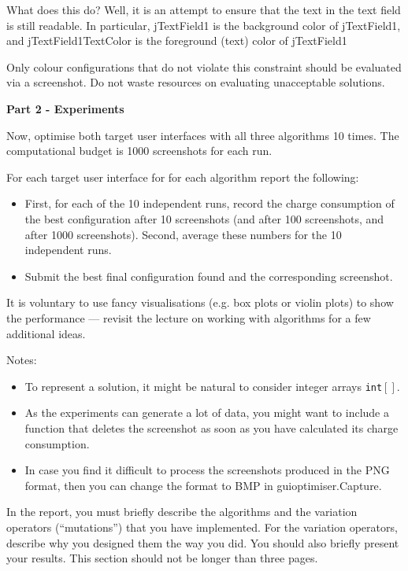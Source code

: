 \documentclass{pracs}
\begin{document}
What does this do? Well, it is an attempt to ensure that the text in the text field is still readable. In particular, jTextField1 is the background color of jTextField1, and jTextField1TextColor is the foreground (text) color of jTextField1

Only colour configurations that do not violate this constraint should be evaluated via a screenshot. Do not waste resources on evaluating unacceptable solutions.

\noindent\textbf{Part 2 - Experiments}

Now, optimise both target user interfaces with all three algorithms 10 times. The computational budget is 1000 screenshots for each run. 

For each target user interface for for each algorithm report the following:
\begin{itemize}
\item First, for each of the 10 independent runs, record the charge consumption of the best configuration after 10 screenshots (and after 100 screenshots, and after 1000 screenshots). Second, average these numbers for the 10 independent runs.
\item Submit the best final configuration found and the corresponding screenshot.
\end{itemize}

It is voluntary to use fancy visualisations (e.g. box plots or violin plots) to show the performance --- revisit the lecture on working with algorithms for a few additional ideas.

Notes:
\begin{itemize}
\item To represent a solution, it might be natural to consider integer arrays \texttt{int}$[]$.
\item As the experiments can generate a lot of data, you might want to include a function that deletes the screenshot as soon as you have calculated its charge consumption.
\item In case you find it difficult to process the screenshots produced in the PNG format, then you can change the format to BMP in guioptimiser.Capture.
\end{itemize}

In the report, you must briefly describe the algorithms and the variation operators (``mutations'') that you have implemented. For the variation operators, describe why you designed them the way you did. 
You should also briefly present your results. This section should not be longer than three pages.
\end{document}
